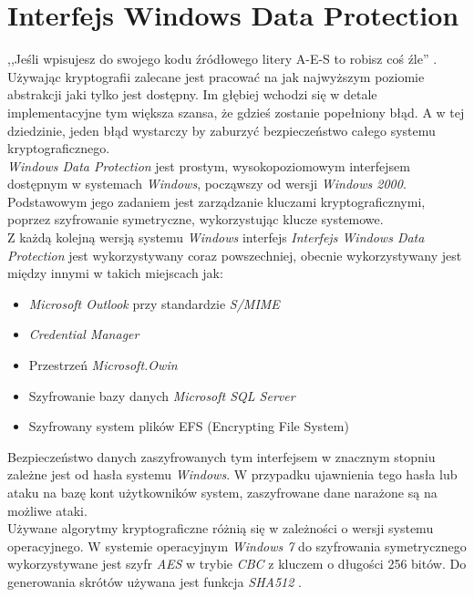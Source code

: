 \section{Interfejs Windows Data Protection} \label{wdp}
,,Jeśli wpisujesz do swojego kodu źródłowego litery A-E-S to robisz coś źle'' \cite{lettersaes}. 
Używając kryptografii zalecane jest pracować na jak najwyższym poziomie abstrakcji jaki tylko 
jest dostępny. Im głębiej wchodzi się w detale implementacyjne tym większa szansa, że 
gdzieś zostanie popełniony błąd. A w tej dziedzinie, jeden błąd wystarczy by zaburzyć 
bezpieczeństwo całego systemu kryptograficznego. \\
\textit{Windows Data Protection} jest prostym, wysokopoziomowym interfejsem dostępnym w systemach 
\textit{Windows}, począwszy od wersji \textit{Windows 2000}. 
Podstawowym jego zadaniem jest zarządzanie kluczami kryptograficznymi, poprzez szyfrowanie symetryczne,
wykorzystując klucze systemowe. \\ 
Z każdą kolejną wersją systemu \textit{Windows} interfejs \textit{Interfejs Windows Data Protection} 
jest wykorzystywany coraz powszechniej, obecnie wykorzystywany jest między innymi w takich miejscach jak:
\begin{itemize}
	\item \textit{Microsoft Outlook} przy standardzie \textit{S/MIME}
	\item \textit{Credential Manager}
	\item Przestrzeń \textit{Microsoft.Owin} 
	\item Szyfrowanie bazy danych \textit{Microsoft SQL Server} 
	\item Szyfrowany system plików EFS (Encrypting File System)
\end{itemize}
Bezpieczeństwo danych zaszyfrowanych tym interfejsem w znacznym stopniu zależne jest od hasła 
systemu \textit{Windows}. W przypadku ujawnienia tego hasła lub ataku na bazę kont użytkowników system,
zaszyfrowane dane narażone są na możliwe ataki. \\
Używane algorytmy kryptograficzne różnią się w zależności o wersji systemu operacyjnego. 
W systemie operacyjnym \textit{Windows 7} do szyfrowania symetrycznego wykorzystywane jest szyfr \textit{AES} 
w trybie \textit{CBC} z kluczem o długości 256 bitów. 
Do generowania skrótów używana jest funkcja \textit{SHA512} \cite{dpapi}.
